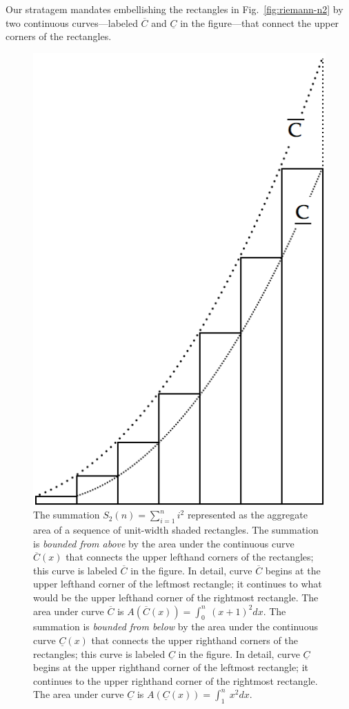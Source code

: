 \begin{enumerate}
Our stratagem mandates embellishing the rectangles in Fig.~\ref{fig:riemann-n2} by two continuous curves---labeled $\overline{C}$ and $\underline{C}$ in the figure---that connect the upper corners of the rectangles.
\begin{figure}[htb]
\centerline{
\includegraphics[scale=0.3]{FiguresMaths/SumSquaresContinuous}
}
\caption{The summation $S_2(n) = \sum_{i=1}^n i^2$ represented as the aggregate area of a sequence of unit-width shaded rectangles.  The summation is {\em bounded from above} by the area under the continuous curve $\overline{C}(x)$ that connects the upper lefthand corners of the rectangles; this curve is labeled $\overline{C}$ in the figure.  In detail, curve $\overline{C}$ begins at the upper lefthand corner of the leftmost rectangle; it continues to what would be the upper lefthand corner of the rightmost rectangle.  The area under curve $\overline{C}$ is $A(\overline{C}(x)) = \int_0^n \ (x+1)^2 dx$.  The summation is {\em bounded from below} by the area under the continuous curve $\underline{C}(x)$ that connects the upper righthand corners of the rectangles; this curve is labeled $\underline{C}$ in the figure.  In detail, curve $\underline{C}$ begins at the upper righthand corner of the leftmost rectangle; it continues to the upper righthand corner of the rightmost rectangle.  The area under curve $\underline{C}$ is $A(\underline{C}(x)) = \int_1^n \ x^2 dx$.}

\end{figure}
\end{enumerate}
